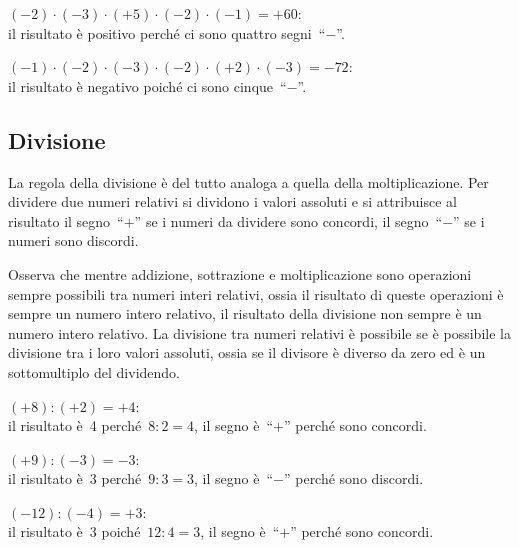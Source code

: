  \begin{esempio}
\((-2)\cdot (-3)\cdot (+5)\cdot (-2)\cdot (-1) = +60\): \\ 
il risultato è positivo perché ci sono quattro segni~``\(-\)''.
 \end{esempio}

 \begin{esempio}
\((-1)\cdot (-2)\cdot (-3)\cdot (-2)\cdot (+2)\cdot (-3) = -72\): \\ 
il risultato è negativo poiché ci sono cinque~``\(-\)''.
 \end{esempio}


\subsection{Divisione}

La regola della divisione è del tutto analoga a quella della 
moltiplicazione.
Per dividere due numeri relativi si dividono i valori assoluti e si 
attribuisce
al risultato il segno~``\(+\)'' se i numeri da dividere sono concordi, il 
segno~``\(-\)'' se i numeri sono discordi.

Osserva che mentre addizione, sottrazione e moltiplicazione sono operazioni 
sempre possibili
tra numeri interi relativi, ossia il risultato di queste operazioni è 
sempre un 
numero intero
relativo, il risultato della divisione non sempre è un numero intero 
relativo. 
La divisione
tra numeri relativi è possibile se è possibile la divisione tra i loro 
valori 
assoluti, ossia se
il divisore è diverso da zero ed è un sottomultiplo del dividendo.
 \begin{esempio}
\((+8):(+2)=+4\): \\
il risultato è~4 perché~\(8:2=4\), il segno è~``\(+\)'' perché sono 
concordi.
 \end{esempio}

\begin{esempio}
\((+9):(-3)=-3\): \\ 
il risultato è~3 perché~\(9:3=3\), il segno è~``\(-\)'' perché sono 
discordi.
 \end{esempio}

\begin{esempio}
\((-12):(-4)=+3\): \\
il risultato è~3 poiché~\(12:4=3\), il segno è~``\(+\)'' perché sono 
concordi.
 \end{esempio}

